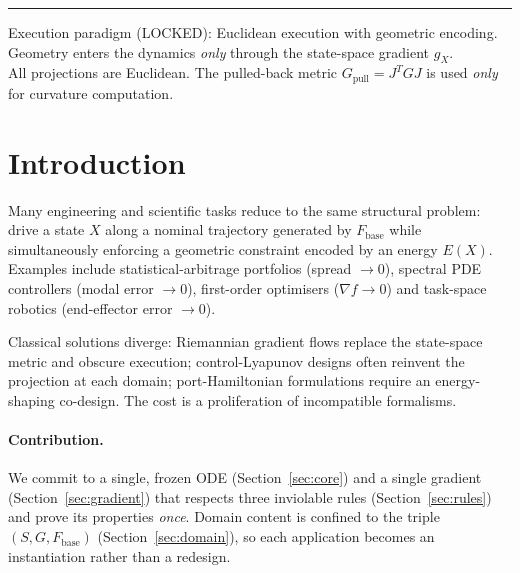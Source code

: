 \documentclass[11pt,oneside]{amsart}
\def\textbf#1{#1}%
\theoremstyle{plain}
\theoremstyle{definition}
\newcommand{\gX}{g_X}
\newcommand{\Fbase}{F_{\mathrm{base}}}
\newcommand{\Gpull}{G_{\mathrm{pull}}}
\begin{document}
{\hypersetup{linkcolor=accent!85!black}
\setcounter{tocdepth}{2}
\tableofcontents}
\vspace{0.6em}
\noindent\textcolor{accent!60!black}{\rule{\linewidth}{0.4pt}}
\vspace{0.4em}
\bigskip

\begin{lockbox}
\textbf{Execution paradigm (LOCKED):} Euclidean execution with geometric encoding.\\
Geometry enters the dynamics \emph{only} through the state-space gradient $\gX$.\\
All projections are Euclidean. The pulled-back metric $\Gpull = J^T G J$ is used
\emph{only} for curvature computation.
\end{lockbox}

\section{Introduction}
\label{sec:intro}

Many engineering and scientific tasks reduce to the same structural
problem: drive a state $X$ along a nominal trajectory generated by
$\Fbase$ while simultaneously enforcing a geometric constraint encoded
by an energy $E(X)$. Examples include statistical-arbitrage portfolios
(spread $\to 0$), spectral PDE controllers (modal error $\to 0$),
first-order optimisers ($\nabla f \to 0$) and task-space robotics
(end-effector error $\to 0$).

Classical solutions diverge: Riemannian gradient flows replace the
state-space metric and obscure execution; control-Lyapunov designs
often reinvent the projection at each domain; port-Hamiltonian
formulations require an energy-shaping co-design. The cost is a
proliferation of incompatible formalisms.

\paragraph{Contribution.} We commit to a single, frozen ODE
(Section~\ref{sec:core}) and a single gradient (Section~\ref{sec:gradient})
that respects three inviolable rules (Section~\ref{sec:rules}) and prove
its properties \emph{once}. Domain content is confined to the triple
$(S,G,\Fbase)$ (Section~\ref{sec:domain}), so each application becomes
an instantiation rather than a redesign.
\end{document}
